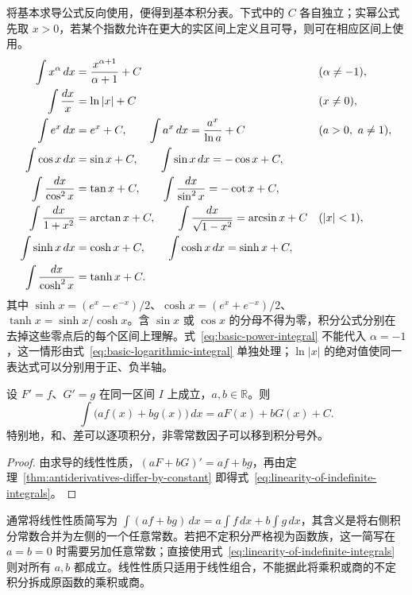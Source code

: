 \documentclass[UTF8,12pt,a4paper,fontset=fandol]{ctexbook}
\begin{document}
将基本求导公式反向使用，便得到基本积分表。下式中的 $C$ 各自独立；实幂公式先取 $x>0$，若某个指数允许在更大的实区间上定义且可导，则可在相应区间上使用。
\begin{align}
    \int x^\alpha\,dx&=\frac{x^{\alpha+1}}{\alpha+1}+C
        &&(\alpha\neq-1),\label{eq:basic-power-integral}\\
    \int\frac{dx}{x}&=\ln|x|+C
        &&(x\neq0),\label{eq:basic-logarithmic-integral}\\
    \int e^x\,dx&=e^x+C,\qquad
    \int a^x\,dx=\frac{a^x}{\ln a}+C
        &&(a>0,\ a\neq1),\notag\\
    \int\cos x\,dx&=\sin x+C,\qquad
    \int\sin x\,dx=-\cos x+C,\notag\\
    \int\frac{dx}{\cos^2x}&=\tan x+C,\qquad
    \int\frac{dx}{\sin^2x}=-\cot x+C,\notag\\
    \int\frac{dx}{1+x^2}&=\arctan x+C,\qquad
    \int\frac{dx}{\sqrt{1-x^2}}=\arcsin x+C
        &&(|x|<1),\notag\\
    \int\sinh x\,dx&=\cosh x+C,\qquad
    \int\cosh x\,dx=\sinh x+C,\notag\\
    \int\frac{dx}{\cosh^2x}&=\tanh x+C.
        \label{eq:basic-hyperbolic-integrals}
\end{align}
其中 $\sinh x=(e^x-e^{-x})/2$、$\cosh x=(e^x+e^{-x})/2$、$\tanh x=\sinh x/\cosh x$。含 $\sin x$ 或 $\cos x$ 的分母不得为零，积分公式分别在去掉这些零点后的每个区间上理解。式~\eqref{eq:basic-power-integral} 不能代入 $\alpha=-1$，这一情形由式~\eqref{eq:basic-logarithmic-integral} 单独处理；$\ln|x|$ 的绝对值使同一表达式可以分别用于正、负半轴。

\begin{proposition}[不定积分的线性性质]
\label{prop:linearity-of-indefinite-integrals}
设 $F'=f$、$G'=g$ 在同一区间 $I$ 上成立，$a,b\in\mathbb{R}$。则
\begin{equation}
    \int\bigl(af(x)+bg(x)\bigr)\,dx=aF(x)+bG(x)+C.
    \label{eq:linearity-of-indefinite-integrals}
\end{equation}
特别地，和、差可以逐项积分，非零常数因子可以移到积分号外。
\end{proposition}

\begin{proof}
由求导的线性性质，$(aF+bG)'=af+bg$，再由定理~\ref{thm:antiderivatives-differ-by-constant} 即得式~\eqref{eq:linearity-of-indefinite-integrals}。
\end{proof}

通常将线性性质简写为 $\int(af+bg)\,dx=a\int f\,dx+b\int g\,dx$，其含义是将右侧积分常数合并为左侧的一个任意常数。若把不定积分严格视为函数族，这一简写在 $a=b=0$ 时需要另加任意常数；直接使用式~\eqref{eq:linearity-of-indefinite-integrals} 则对所有 $a,b$ 都成立。线性性质只适用于线性组合，不能据此将乘积或商的不定积分拆成原函数的乘积或商。
\end{document}
